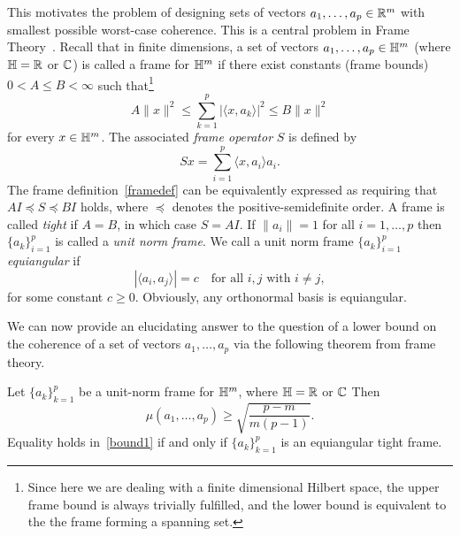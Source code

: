 This motivates the problem of designing sets of vectors $a_1,\dots,a_p\in\mathbb{R}^m$ with smallest possible worst-case coherence. This is a central problem in Frame Theory~\cite{SH03,Chr03,Casazza_Kutyniok_2012,waldron2018introduction}.
Recall that in finite dimensions, a set of vectors $a_1,\dots,a_p \in\mathbb{H}^m$ (where $\mathbb{H} = \mathbb{R}$ or $\mathbb{C}$) is called a frame for $\mathbb{H}^m$ if 
there exist constants (frame bounds) $0<A\le B < \infty$ such that\footnote{Since here we are dealing with a finite dimensional Hilbert space, the upper frame bound is always trivially fulfilled, and the lower bound is equivalent to the the frame forming a spanning set.}
\begin{equation}\label{framedef}
    A \|x\|^2 \le \sum_{k=1}^p | \langle x,a_k \rangle |^2 \le B \|x\|^2
\end{equation}
for every $x\in \mathbb{H}^m$. 
The associated {\em frame operator} $S$ is defined by
\begin{equation} \label{frameop}
Sx = \sum_{i=1}^p \langle x,a_i \rangle a_i.
\end{equation}
The frame definition~\eqref{framedef} can be equivalently expressed as 
requiring that $A I \preccurlyeq S \preccurlyeq B I$ holds, where $\preccurlyeq$ denotes the positive-semidefinite order. 
A frame is called {\em tight} if $A=B$, in which case
$S=AI$. 
If $\|a_i\| = 1$ for all $i=1,\dots,p$ then $\{a_k\}_{i=1}^p$ is called a {\em unit norm frame}. We call a unit norm frame $\{a_k\}_{i=1}^p$ {\em equiangular} if
\begin{equation}
\label{defequi}
|\langle a_i,a_j \rangle| = c \quad 
\text{for all $i,j$ with $i \neq j,$}
\end{equation}
for some constant $c\ge 0$.
Obviously, any orthonormal basis is equiangular.


We can now provide an elucidating answer to the question of a lower bound on the coherence of a set of vectors $a_1,\dots,a_p$ via the following theorem from frame theory.
\begin{theorem}[\cite{SH03}]
\label{th:bound}
Let $\{a_k\}_{k=1}^p$ be a unit-norm frame for $\mathbb{H}^m$, where $\mathbb{H} = \mathbb{R}$ or $\mathbb{C}$ Then
\begin{equation}
\mu(a_1,\dots,a_p) \ge \sqrt{\frac{p-m}{m(p-1)}}.
\label{bound1}
\end{equation}
Equality holds in~\eqref{bound1} if and only if $\{a_k\}_{k=1}^p$ is an equiangular tight frame.

\end{theorem}

